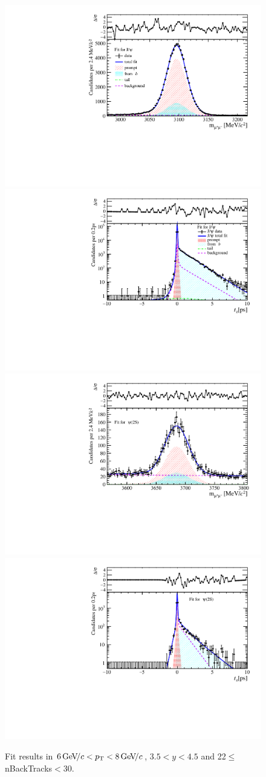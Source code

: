 \begin{figure}[H]
\begin{center}
\includegraphics[width=0.47\linewidth]{pdf/Jpsi/drawmassB/n4y3pt4.pdf}
\includegraphics[width=0.47\linewidth]{pdf/Jpsi/2DFitB/n4y3pt4.pdf}
\vspace*{-0.5cm}
\includegraphics[width=0.47\linewidth]{pdf/Psi2S/drawmassB/n4y3pt4.pdf}
\includegraphics[width=0.47\linewidth]{pdf/Psi2S/2DFitB/n4y3pt4.pdf}
\vspace*{-0.5cm}
\end{center}
\caption{Fit results in $6\text{\,Ge\kern -0.1em V\!/}c<p_{\mathrm{T}}<8\text{\,Ge\kern -0.1em V\!/}c$, $3.5<y<4.5$ and 22$\leq$nBackTracks$<$30.}
\label{Fitn4y3pt4}
\end{figure}
